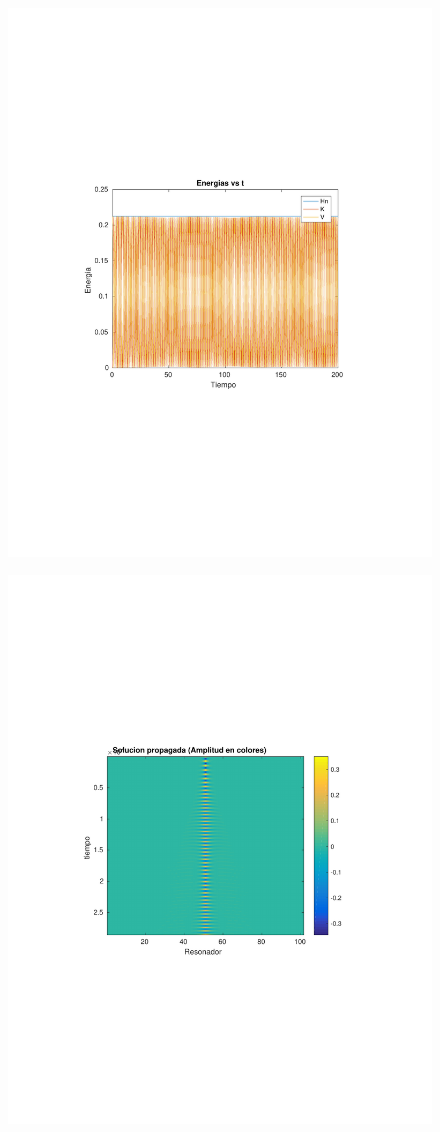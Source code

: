 \documentclass[10pt,a4paper]{article}
\begin{document}
\begin{figure}[h!]
\centering 
\includegraphics[scale=0.8]{E1.pdf}
\end{figure}


\begin{figure}[h!]
\centering 
\includegraphics[scale=0.8]{SP1.pdf}
\end{figure}
\end{document}
